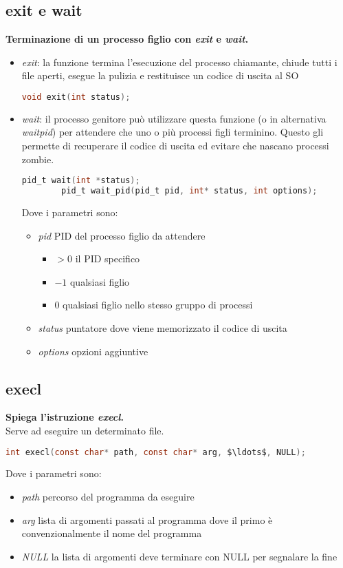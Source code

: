 \documentclass[a4paper,10pt]{article}
\theoremstyle{remark}
\theoremstyle{definition}
\theoremstyle{plain}
\theoremstyle{definition}
\theoremstyle{definition}
\theoremstyle{definition}
\theoremstyle{plain}
\theoremstyle{plain}
\begin{document}
\subsection{exit e wait}
\textbf{Terminazione di un processo figlio con \textit{exit} e \textit{wait}.}\\
\begin{itemize}
	\item \textit{exit}: la funzione termina l'esecuzione del processo chiamante, chiude tutti i file aperti, esegue la pulizia e restituisce un codice di uscita al SO
	\begin{lstlisting}[language=C]
		void exit(int status);
	\end{lstlisting}
	\item \textit{wait}: il processo genitore può utilizzare questa funzione (o in alternativa \textit{waitpid}) per attendere che uno o più processi figli terminino. Questo gli permette di recuperare il codice di uscita ed evitare che nascano processi zombie.
	\begin{lstlisting}[language=C]
		pid_t wait(int *status);
		pid_t wait_pid(pid_t pid, int* status, int options);
	\end{lstlisting}
	Dove i parametri sono:
	\begin{itemize}
		\item \textit{pid} PID del processo figlio da attendere
		\begin{itemize}
			\item $>0$ il PID specifico
			\item $-1$ qualsiasi figlio
			\item $0$ qualsiasi figlio nello stesso gruppo di processi
		\end{itemize}
		\item \textit{status} puntatore dove viene memorizzato il codice di uscita
		\item \textit{options} opzioni aggiuntive
	\end{itemize}
\end{itemize}
\subsection{execl}
\textbf{Spiega l'istruzione \textit{execl}.}\\
Serve ad eseguire un determinato file.
\begin{lstlisting}[language=C, mathescape]
	int execl(const char* path, const char* arg, $\ldots$, NULL);
\end{lstlisting}
Dove i parametri sono:
\begin{itemize}
	\item \textit{path} percorso del programma da eseguire
	\item \textit{arg} lista di argomenti passati al programma dove il primo è convenzionalmente il nome del programma
	\item \textit{NULL} la lista di argomenti deve terminare con NULL per segnalare la fine
\end{itemize}
\newpage
\end{document}
